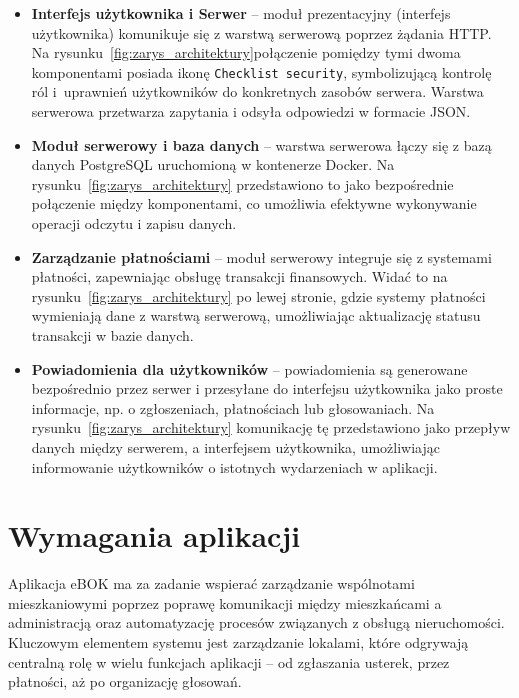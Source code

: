 \begin{itemize}

	\item \textbf{Interfejs użytkownika i Serwer} -- moduł prezentacyjny (interfejs użytkownika) komunikuje się z warstwą serwerową poprzez żądania HTTP. Na rysunku~\ref{fig:zarys_architektury}połączenie pomiędzy tymi dwoma komponentami posiada ikonę \texttt{Checklist security}, symbolizującą kontrolę ról i~uprawnień użytkowników do konkretnych zasobów serwera. Warstwa serwerowa przetwarza zapytania i odsyła odpowiedzi w formacie JSON.

	\item \textbf{Moduł serwerowy i baza danych} -- warstwa serwerowa łączy się z bazą danych PostgreSQL uruchomioną w kontenerze Docker. Na rysunku~\ref{fig:zarys_architektury} przedstawiono to jako bezpośrednie połączenie między komponentami, co umożliwia efektywne wykonywanie operacji odczytu i zapisu danych.

	\item \textbf{Zarządzanie płatnościami} -- moduł serwerowy integruje się z systemami płatności, zapewniając obsługę transakcji finansowych. Widać to na rysunku~\ref{fig:zarys_architektury} po lewej stronie, gdzie systemy płatności wymieniają dane z warstwą serwerową, umożliwiając aktualizację statusu transakcji w bazie danych.

	\item \textbf{Powiadomienia dla użytkowników} -- powiadomienia są generowane bezpośrednio przez serwer i przesyłane do interfejsu użytkownika jako proste informacje, np. o zgłoszeniach, płatnościach lub głosowaniach. Na rysunku~\ref{fig:zarys_architektury} komunikację tę przedstawiono jako przepływ danych między serwerem, a interfejsem użytkownika, umożliwiając informowanie użytkowników o istotnych wydarzeniach w aplikacji.
	
\end{itemize}


\section{Wymagania aplikacji} %

Aplikacja eBOK ma za zadanie wspierać zarządzanie wspólnotami mieszkaniowymi poprzez poprawę komunikacji między mieszkańcami a administracją oraz automatyzację procesów związanych z obsługą nieruchomości. Kluczowym elementem systemu jest zarządzanie lokalami, które odgrywają centralną rolę w wielu funkcjach aplikacji – od zgłaszania usterek, przez płatności, aż po organizację głosowań.

